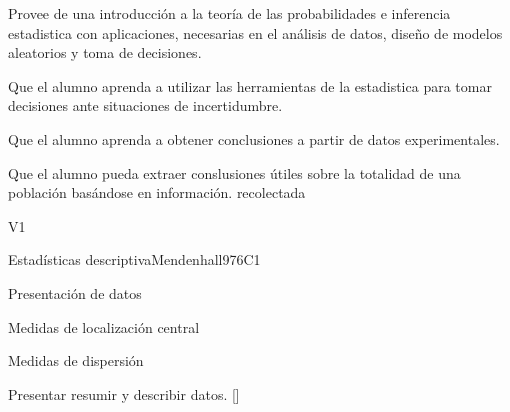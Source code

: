 
\begin{syllabus}


\begin{justification}
Provee de una introducción a la teoría de las probabilidades e inferencia estadistica  con aplicaciones, necesarias en el análisis de datos, diseño de modelos aleatorios y toma de decisiones.
\end{justification}

\begin{goals}
\item Que el alumno aprenda a utilizar las herramientas de la estadistica  para tomar decisiones ante situaciones de incertidumbre.
\item Que el alumno aprenda a obtener conclusiones a partir de datos experimentales.
\item Que el alumno pueda extraer conslusiones útiles sobre la totalidad de una población basándose en información. recolectada
\end{goals}

\begin{outcomes}{V1}
   \item {}
   \item {}
   \item {}
\end{outcomes}

\begin{competences}
    \item {} 
    \item {}
    \item {}
\end{competences}


\begin{unit}{}{Estadísticas descriptiva}{Mendenhall97}{6}{C1}
\begin{topics}
      \item Presentación de datos
      \item Medidas de localización central
      \item Medidas de dispersión
   \end{topics}

   \begin{learningoutcomes}
      \item Presentar resumir y describir datos. [\Usage]
   \end{learningoutcomes}
\end{unit}


\end{syllabus}
